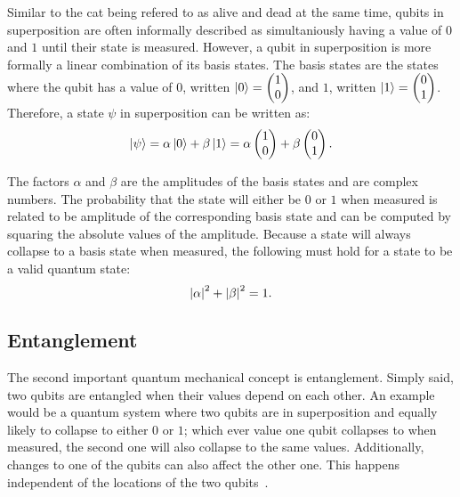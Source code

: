 Similar to the cat being refered to as alive and dead at the same time, qubits in superposition are often informally described as simultaniously having a value of $0$ and $1$ until their state is measured. However, a qubit in superposition is more formally a linear combination of its basis states. The basis states are the states where the qubit has a value of $0$, written $\ket{0} = \begin{pmatrix} 1 \\ 0 \end{pmatrix}$, and $1$, written $\ket{1} = \begin{pmatrix} 0 \\ 1 \end{pmatrix}$. Therefore, a state $\psi$ in superposition can be written as:
\begin{equation*}
    \ket{\psi} = \alpha \ket{0} + \beta \ket{1} = \alpha \begin{pmatrix} 1 \\ 0 \end{pmatrix} + \beta \begin{pmatrix} 0 \\ 1 \end{pmatrix}.
\end{equation*}

The factors $\alpha$ and $\beta$ are the amplitudes of the basis states and are complex numbers. The probability that the state will either be $0$ or $1$ when measured is related to be amplitude of the corresponding basis state and can be computed by squaring the absolute values of the amplitude. Because a state will always collapse to a basis state when measured, the following must hold for a state to be a valid quantum state:
\begin{equation*}
    \abs{\alpha}^2 + \abs{\beta}^2 = 1.
\end{equation*}

\subsection{Entanglement}
The second important quantum mechanical concept is entanglement. Simply said, two qubits are entangled when their values depend on each other. An example would be a quantum system where two qubits are in superposition and equally likely to collapse to either $0$ or $1$; which ever value one qubit collapses to when measured, the second one will also collapse to the same values. Additionally, changes to one of the qubits can also affect the other one. This happens independent of the locations of the two qubits~\cite{RDB*22, HHHH09}. 

